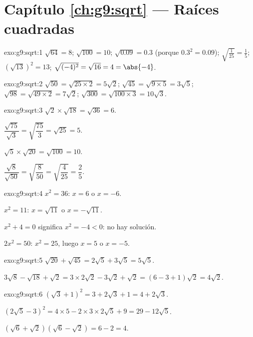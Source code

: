 \section*{Capítulo \ref{ch:g9:sqrt} --- Raíces cuadradas}

\begin{solution}{exo:g9:sqrt:1}
$\sqrt{64} = 8$; \quad $\sqrt{100} = 10$; \quad
$\sqrt{0.09} = 0.3$ (porque $0.3^2 = 0.09$); \quad
$\sqrt{\frac{1}{25}} = \frac15$; \quad
$\left(\sqrt{13}\right)^2 = 13$; \quad
$\sqrt{(-4)^2} = \sqrt{16} = 4 = \abs{-4}$.
\end{solution}

\begin{solution}{exo:g9:sqrt:2}
$\sqrt{50} = \sqrt{25 \times 2} = 5\sqrt2$; \quad
$\sqrt{45} = \sqrt{9 \times 5} = 3\sqrt5$; \quad
$\sqrt{98} = \sqrt{49 \times 2} = 7\sqrt2$; \quad
$\sqrt{300} = \sqrt{100 \times 3} = 10\sqrt3$.
\end{solution}

\begin{solution}{exo:g9:sqrt:3}
$\sqrt2 \times \sqrt{18} = \sqrt{36} = 6$.

$\dfrac{\sqrt{75}}{\sqrt3} = \sqrt{\dfrac{75}{3}} = \sqrt{25} = 5$.

$\sqrt5 \times \sqrt{20} = \sqrt{100} = 10$.

$\dfrac{\sqrt8}{\sqrt{50}} = \sqrt{\dfrac{8}{50}} = \sqrt{\dfrac{4}{25}}
= \dfrac25$.
\end{solution}

\begin{solution}{exo:g9:sqrt:4}
$x^2 = 36$: $x = 6$ o $x = -6$.

$x^2 = 11$: $x = \sqrt{11}$ o $x = -\sqrt{11}$.

$x^2 + 4 = 0$ significa $x^2 = -4 < 0$: no hay solución.

$2x^2 = 50$: $x^2 = 25$, luego $x = 5$ o $x = -5$.
\end{solution}

\begin{solution}{exo:g9:sqrt:5}
$\sqrt{20} + \sqrt{45} = 2\sqrt5 + 3\sqrt5 = 5\sqrt5$.

$3\sqrt8 - \sqrt{18} + \sqrt2 = 3 \times 2\sqrt2 - 3\sqrt2 + \sqrt2
= (6 - 3 + 1)\sqrt2 = 4\sqrt2$.
\end{solution}

\begin{solution}{exo:g9:sqrt:6}
$\left(\sqrt3 + 1\right)^2 = 3 + 2\sqrt3 + 1 = 4 + 2\sqrt3$.

$\left(2\sqrt5 - 3\right)^2 = 4 \times 5 - 2 \times 3 \times 2\sqrt5 + 9
= 29 - 12\sqrt5$.

$\left(\sqrt6 + \sqrt2\right)\left(\sqrt6 - \sqrt2\right) = 6 - 2 = 4$.
\end{solution}

